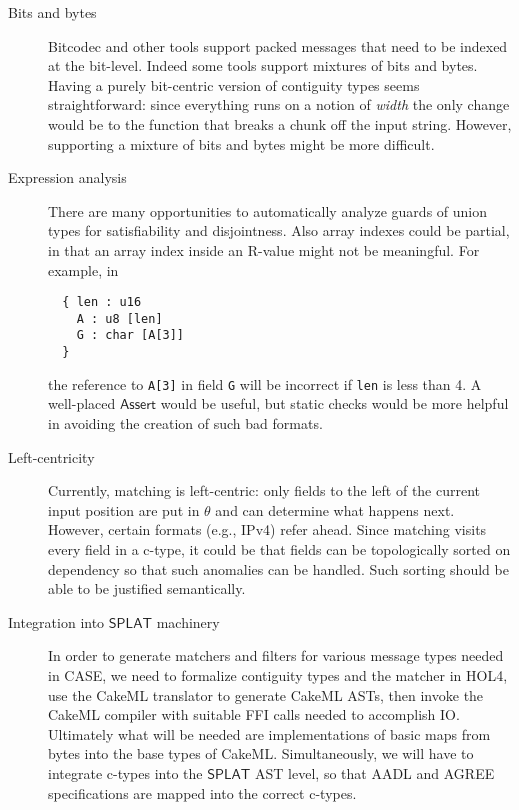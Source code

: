 \documentclass[svgnames]{llncs}
\newcommand{\eg}{e.g.}
\newcommand{\konst}[1]{\ensuremath{\mathsf{#1}}}
\begin{document}
\begin{description}

\item [Bits and bytes] Bitcodec \cite{} and other tools support packed
  messages that need to be indexed at the bit-level. Indeed some tools
  support mixtures of bits and bytes. Having a purely bit-centric
  version of contiguity types seems straightforward: since everything
  runs on a notion of \emph{width} the only change would be to the
  function that breaks a chunk off the input string. However,
  supporting a mixture of bits and bytes might be more difficult.

\item [Expression analysis] There are many opportunities to
  automatically analyze guards of union types for satisfiability and
  disjointness. Also array indexes could be partial, in that an array
  index inside an R-value might not be meaningful. For example, in

\begin{verbatim}
  { len : u16
    A : u8 [len]
    G : char [A[3]]
  }
\end{verbatim}

the reference to \verb+A[3]+ in field \verb+G+ will be incorrect if
\verb+len+ is less than 4. A well-placed \konst{Assert} would be
useful, but static checks would be more helpful in avoiding the
creation of such bad formats.

\item [Left-centricity] Currently, matching is left-centric: only
  fields to the left of the current input position are put in $\theta$
  and can determine what happens next. However, certain formats (\eg,
  IPv4) refer ahead. Since matching visits every field in a c-type, it
  could be that fields can be topologically sorted on dependency so
  that such anomalies can be handled. Such sorting should be able to
  be justified semantically.

\item [Integration into \konst{SPLAT} machinery] In order to generate
  matchers and filters for various message types needed in CASE, we
  need to formalize contiguity types and the matcher in HOL4, use the
  CakeML translator to generate CakeML ASTs, then invoke the CakeML
  compiler with suitable FFI calls needed to accomplish IO. Ultimately
  what will be needed are implementations of basic maps from bytes
  into the base types of CakeML. Simultaneously, we will have to
  integrate c-types into the \konst{SPLAT} AST level, so that AADL and
  AGREE specifications are mapped into the correct c-types.

\end{description}
\end{document}
